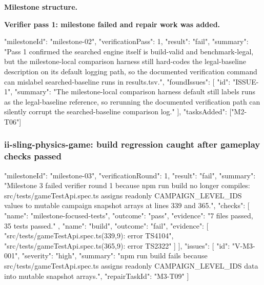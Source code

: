 \documentclass[11pt,a4paper]{article}
\begin{document}
\textbf{Milestone structure.}

\begin{cbox}
\end{cbox}

\textbf{Verifier pass 1: milestone failed and repair work was added.}

\begin{cbox}
{
  "milestoneId": "milestone-02",
  "verificationPass": 1,
  "result": "fail",
  "summary": "Pass 1 confirmed the searched engine itself is build-valid and benchmark-legal, but the milestone-local comparison harness still hard-codes the legal-baseline description on its default logging path, so the documented verification command can mislabel searched-baseline runs in results.tsv.",
  "foundIssues": [
    { "id": "ISSUE-1",
      "summary": "The milestone-local comparison harness default still labels runs as the legal-baseline reference, so rerunning the documented verification path can silently corrupt the searched-baseline comparison log." }
  ],
  "tasksAdded": ["M2-T06"]
}
\end{cbox}

\subsubsection{ii-sling-physics-game: build regression caught after gameplay checks passed}

\begin{cbox}
{
  "milestoneId": "milestone-03",
  "verificationRound": 1,
  "result": "fail",
  "summary": "Milestone 3 failed verifier round 1 because npm run build no longer compiles: src/tests/gameTestApi.spec.ts assigns readonly CAMPAIGN_LEVEL_IDS values to mutable campaign snapshot arrays at lines 339 and 365.",
  "checks": [
    { "name": "milestone-focused-tests", "outcome": "pass", "evidence": "7 files passed, 35 tests passed." },
    { "name": "build", "outcome": "fail",
      "evidence": [
        "src/tests/gameTestApi.spec.ts(339,9): error TS4104",
        "src/tests/gameTestApi.spec.ts(365,9): error TS2322"
      ] }
  ],
  "issues": [
    { "id": "V-M3-001", "severity": "high",
      "summary": "npm run build fails because src/tests/gameTestApi.spec.ts assigns readonly CAMPAIGN_LEVEL_IDS data into mutable snapshot arrays.",
      "repairTaskId": "M3-T09" }
  ]
}
\end{cbox}
\end{document}
